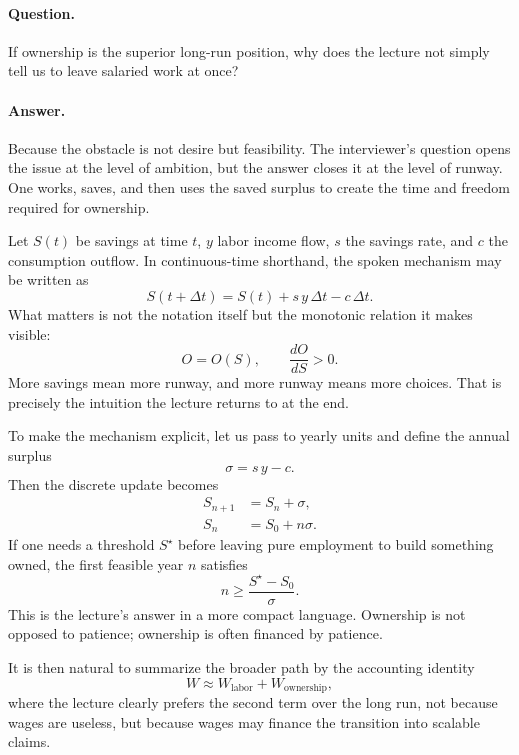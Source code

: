 \paragraph{Question.}
If ownership is the superior long-run position, why does the lecture not simply tell us to leave salaried work at once?

\paragraph{Answer.}
Because the obstacle is not desire but feasibility. The interviewer's question opens the issue at the level of ambition, but the answer closes it at the level of runway. One works, saves, and then uses the saved surplus to create the time and freedom required for ownership.

Let \(S(t)\) be savings at time \(t\), \(y\) labor income flow, \(s\) the savings rate, and \(c\) the consumption outflow. In continuous-time shorthand, the spoken mechanism may be written as
\begin{equation}
S(t+\Delta t)=S(t)+s\,y\,\Delta t-c\,\Delta t.
\end{equation}
What matters is not the notation itself but the monotonic relation it makes visible:
\begin{equation}
O=O(S), \qquad \frac{dO}{dS}>0.
\end{equation}
More savings mean more runway, and more runway means more choices. That is precisely the intuition the lecture returns to at the end.

To make the mechanism explicit, let us pass to yearly units and define the annual surplus
\begin{equation}
\sigma = s\,y-c.
\end{equation}
Then the discrete update becomes
\begin{align}
S_{n+1} &= S_n + \sigma, \\
S_n &= S_0 + n\sigma.
\end{align}
If one needs a threshold \(S^\star\) before leaving pure employment to build something owned, the first feasible year \(n\) satisfies
\begin{equation}
n \ge \frac{S^\star-S_0}{\sigma}.
\end{equation}
This is the lecture's answer in a more compact language. Ownership is not opposed to patience; ownership is often financed by patience.

It is then natural to summarize the broader path by the accounting identity
\begin{equation}
W \approx W_{\text{labor}} + W_{\text{ownership}},
\end{equation}
where the lecture clearly prefers the second term over the long run, not because wages are useless, but because wages may finance the transition into scalable claims.

